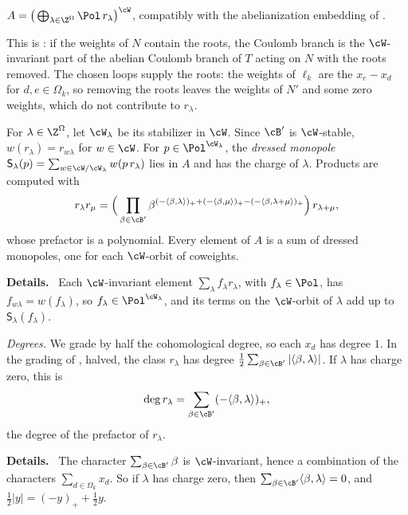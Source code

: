 \documentclass[11pt]{amsart}
\newenvironment{details}{\par\color{black!60!green}\noindent\textbf{Details.}\ }{\par}
\begin{document}
\begin{proposition}[Teleman]\label{prop:teleman}
$A=\big(\bigoplus_{\lambda\in\Z^\Omega}\Pol\,r_\lambda\big)^{\cW}$, compatibly
with the abelianization embedding of \cite[Lemma~5.17]{BFN}.
\end{proposition}

This is \cite[App.~A, Thm.~6]{telemanRoleCoulomb2021}: if the weights of $N$ contain
the roots, the Coulomb branch is the $\cW$-invariant part of the abelian
Coulomb branch of $T$ acting on $N$ with the roots removed.  The chosen
loops supply the roots: the weights of $\ell_k$ are the $x_e-x_d$ for
$d,e\in\Omega_k$, so removing the roots leaves the weights of $N'$ and some
zero weights, which do not contribute to $r_\lambda$.

For $\lambda\in\Z^\Omega$, let $\cW_\lambda$ be its stabilizer in $\cW$.
Since $\cB'$ is $\cW$-stable, $w(r_\lambda)=r_{w\lambda}$ for $w\in\cW$.  For
$p\in \Pol^{\cW_\lambda}$, the \emph{dressed
monopole} $\mathsf S_\lambda(p)=\sum_{w\in\cW/\cW_\lambda}w(p\,r_\lambda)$ lies
in $A$ and has the charge of $\lambda$.  Products are computed with
\begin{equation}\label{eq:rr}
 r_\lambda r_\mu=\Big(\prod_{\beta\in\cB'}\beta^{(-\langle\beta,\lambda\rangle)_+
 +(-\langle\beta,\mu\rangle)_+-(-\langle\beta,\lambda+\mu\rangle)_+}\Big)\,r_{\lambda+\mu},
\end{equation}
whose prefactor is a polynomial.  Every element of $A$ is a sum of dressed
monopoles, one for each $\cW$-orbit of coweights.
\begin{details}
Each $\cW$-invariant element
$\sum_\lambda f_\lambda r_\lambda$, with $f_\lambda\in\Pol$, has
$f_{w\lambda}=w(f_\lambda)$, so $f_\lambda\in\Pol^{\cW_\lambda}$, and its terms
on the $\cW$-orbit of $\lambda$ add up to $\mathsf S_\lambda(f_\lambda)$.
\end{details}

\emph{Degrees.}  We grade by half the cohomological degree, so each $x_d$
has degree $1$.  In the grading of \cite{BFN}, halved, the class
$r_\lambda$ has degree $\frac12\sum_{\beta\in\cB'}|\langle\beta,\lambda\rangle|$.
If $\lambda$ has charge zero, this is
\[
 \deg r_\lambda=\sum_{\beta\in\cB'}(-\langle\beta,\lambda\rangle)_+,
\]
the degree of the prefactor of $r_\lambda$.
\begin{details}
The character $\sum_{\beta\in\cB'}\beta$ is $\cW$-invariant, hence a
combination of the characters $\sum_{d\in\Omega_k}x_d$.  So if $\lambda$ has
charge zero, then $\sum_{\beta\in\cB'}\langle\beta,\lambda\rangle=0$, and
$\frac12|y|=(-y)_++\frac12y$.
\end{details}
\end{document}
